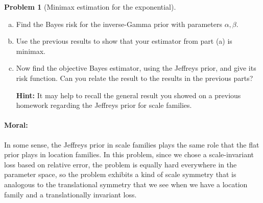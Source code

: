 \documentclass{article}
\theoremstyle{definition}
\newtheorem{problem}{Problem}
\begin{document}
\begin{problem}[Minimax estimation for the exponential]
\begin{enumerate}[(a)]
\item Find the Bayes risk for the inverse-Gamma prior with parameters $\alpha,\beta$.



\item Use the previous results to show that your estimator from part (a) is minimax.



\item Now find the objective Bayes estimator, using the Jeffreys prior, and give its risk function. Can you relate the result to the results in the previous parts?

{\bf Hint:} It may help to recall the general result you showed on a previous homework regarding the Jeffreys prior for scale families.



\end{enumerate}

\paragraph{Moral:} In some sense, the Jeffreys prior in scale families plays the same role that the flat prior plays in location families. In this problem, since we chose a scale-invariant loss based on relative error, the problem is equally hard everywhere in the parameter space, so the problem exhibits a kind of scale symmetry that is analogous to the translational symmetry that we see when we have a location family and a translationally invariant loss.

\end{problem}
\end{document}
